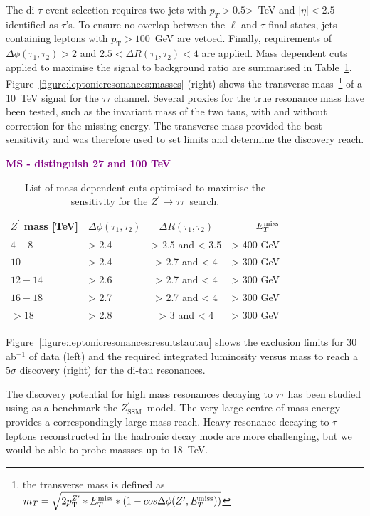 \documentclass[a4paper,11pt]{article}
\newcommand{\MS}[1] {\textbf{\textcolor{purple}{MS - #1}}}
\newcommand{\Zp}{\ensuremath{Z^{\prime}}}
\newcommand{\ZpSSM}{\ensuremath{Z^{\prime}_{\mathrm{SSM}}}}
\newcommand*{\Zptata}{\ensuremath{Z^{\prime}\rightarrow \tau\tau}}
\newcommand{\pt}{\ensuremath{p_{\text{T}}}}
\newcommand{\ptZp}{\ensuremath{p_{\text{T}}^{\ensuremath{Z^{\prime}}}}}
\newcommand*{\met}{\ensuremath{E_{T}^{\rm{miss}}}}
\begin{document}
The di-$\tau$ event selection requires two jets with $p_{T} > 0.5$>~TeV and $|\eta|<2.5$ identified as $\tau$'s. To ensure no overlap between the $\ell$ and $\tau$ final states, jets containing leptons with $\pt > 100$~GeV are vetoed. Finally, requirements of $\Delta \phi(\tau_1, \tau_2)> 2$ and $2.5<\Delta R(\tau_1, \tau_2)<4$ are applied.
Mass dependent cuts applied to maximise the signal to background ratio are summarised in Table~\ref{tab:leptonicresonances:selectiontautau}. Figure~\ref{figure:leptonicresonances:masses} (right) shows the transverse mass~\footnote{the transverse mass is defined as $m_{T}  =  \sqrt{2\ptZp*\met*(1-cos\Delta\phi(\Zp,\met))} $}
of a 10~TeV signal for the $\tau\tau$ channel. Several proxies for the true resonance mass have been tested, such as the invariant mass of the two taus, with and without correction for the missing energy. The transverse mass provided the best sensitivity and was therefore used to set limits and determine the discovery reach.

\MS{distinguish 27 and 100 TeV}

\begin{table}[htbp]
   \centering
\begin{tabular}{|l|l|c|r|}
  \hline
  \hline
   $\Zp$ mass [TeV] &  $\Delta \phi(\tau_1, \tau_2)$&  $\Delta R(\tau_1, \tau_2)$ & $\met$\\
  \hline
  $4-8$ & > 2.4 & > 2.5 and < 3.5 & > 400 GeV\\
  $10$ & > 2.4 & > 2.7 and < 4 & > 300 GeV\\
  $12-14$ & > 2.6 & > 2.7 and < 4 & > 300 GeV\\
  $16-18$ & > 2.7 & > 2.7 and < 4 & > 300 GeV\\
  $>18$ & > 2.8 & > 3 and < 4 & > 300 GeV\\
  \hline
  \hline
  \end{tabular}
  \caption{List of mass dependent cuts optimised to maximise the sensitivity for the \Zptata\ search.}
  \label{tab:leptonicresonances:selectiontautau}
\end{table}

Figure~\ref{figure:leptonicresonances:resultstautau} shows the exclusion limits for 30 ab$^{-1}$ of data (left) and the required integrated luminosity
versus mass to reach a $5\sigma$ discovery (right) for the di-tau resonances.

The discovery potential for high mass resonances decaying to $\tau\tau$ has been studied using as a benchmark the \ZpSSM\ model. The very large centre of mass energy provides a correspondingly large mass reach. Heavy resonance decaying to $\tau$ leptons reconstructed in the hadronic decay mode are more challenging, but we would be able to probe massses up to 18~TeV.
\end{document}
